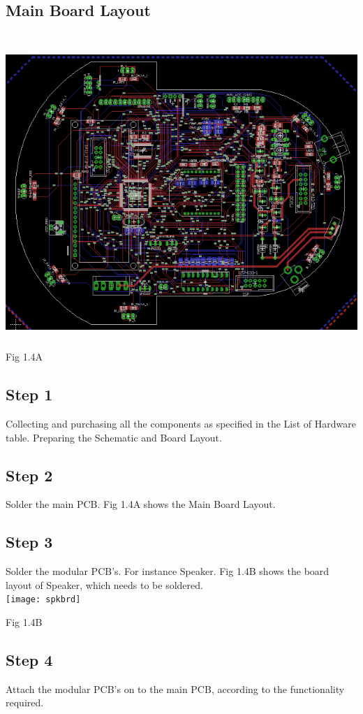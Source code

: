 \documentclass[a4paper,12pt,oneside]{book}
\begin{document}
\subsection*{Main Board Layout}
 \\\hfill\includegraphics[width=14cm, height=11cm]{mainbrd}
 \caption{Fig 1.4A}
\subsection*{Step 1}
Collecting and purchasing all the components as specified in the List of Hardware table. Preparing the Schematic and Board Layout.
\subsection*{Step 2}
Solder the main PCB. Fig 1.4A shows the Main Board Layout.
\subsection*{Step 3}
Solder the modular PCB's. For instance Speaker. Fig 1.4B shows the board layout of Speaker, which needs to be soldered.
\\\hfill\texttt{[image: spkbrd]}
 \caption{Fig 1.4B}
\subsection*{Step 4}
Attach the modular PCB's on to the main PCB, according to the functionality required.
\end{document}
